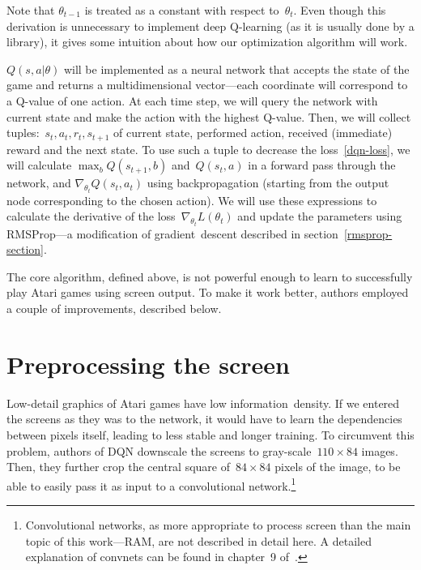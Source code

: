 Note that $\theta_{t-1}$ is treated as a constant with respect to~$\theta_t$. Even though this derivation is unnecessary to implement deep Q-learning (as it is usually done by a library), it gives some intuition about how our optimization algorithm will work.

$Q(s, a|\theta)$ will be implemented as a neural network that accepts the state of the game and returns a multidimensional vector---each coordinate will correspond to a Q-value of one action. At each time step, we will query the network with current state and make the action with the highest Q-value.
Then, we will collect tuples:~$s_t, a_t, r_t, s_{t+1}$ of current state, performed action, received (immediate) reward and the next state. To use such a tuple to decrease the loss~\eqref{dqn-loss}, we will calculate $\max_b Q(s_{t+1}, b)$ and~$Q(s_t, a)$ in a forward pass through the network, and $\nabla_{\theta_t} Q(s_t, a_t)$ using backpropagation (starting from the output node corresponding to the chosen action). We will use these expressions to calculate the derivative of the loss~$\nabla_{\theta_t} L(\theta_t)$ and update the parameters using RMSProp---a modification of gradient~descent described in section~\ref{rmsprop-section}.

The core algorithm, defined above, is not powerful enough to learn to successfully play Atari games using screen output. To make it work better, authors employed a couple of improvements, described below.

\section{Preprocessing the screen}
Low-detail graphics of Atari games have low information~density. If we entered the screens as they was to the network, it would have to learn the dependencies between pixels itself, leading to less stable and longer training. To circumvent this problem, authors of DQN downscale the screens to gray-scale~$110 \times 84$ images. Then, they further crop the central square of~$84 \times 84$ pixels of the image, to be able to easily pass it as input to a convolutional network.\footnote{Convolutional networks, as more appropriate to process screen than the main topic of this work---RAM, are not described in detail here. A detailed explanation of convnets can be found in chapter~9 of~\cite{dlbook}.}

